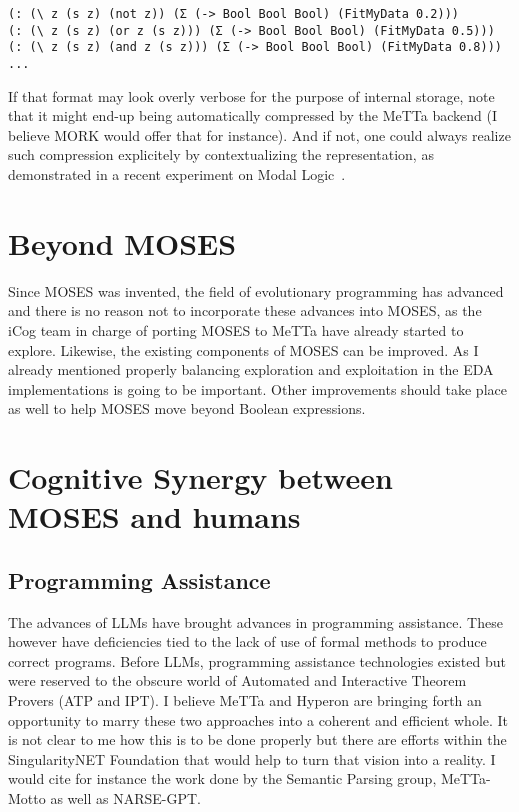 \documentclass[]{report}
\begin{document}
{\small
\begin{verbatim}
(: (\ z (s z) (not z)) (Σ (-> Bool Bool Bool) (FitMyData 0.2)))
(: (\ z (s z) (or z (s z))) (Σ (-> Bool Bool Bool) (FitMyData 0.5)))
(: (\ z (s z) (and z (s z))) (Σ (-> Bool Bool Bool) (FitMyData 0.8)))
...
\end{verbatim}
} If that format may look overly verbose for the purpose of internal
storage, note that it might end-up being automatically compressed by
the MeTTa backend (I believe MORK would offer that for instance).  And
if not, one could always realize such compression explicitely by
contextualizing the representation, as demonstrated in a recent
experiment on Modal Logic~\cite{ModalLogic}.

\section{Beyond MOSES}

Since MOSES was invented, the field of evolutionary programming has
advanced and there is no reason not to incorporate these advances into
MOSES, as the iCog team in charge of porting MOSES to MeTTa have
already started to explore.  Likewise, the existing components of
MOSES can be improved.  As I already mentioned properly balancing
exploration and exploitation in the EDA implementations is going to be
important.  Other improvements should take place as well to help MOSES
move beyond Boolean expressions.

\section{Cognitive Synergy between MOSES and humans}

\subsection{Programming Assistance}

The advances of LLMs have brought advances in programming assistance.
These however have deficiencies tied to the lack of use of formal
methods to produce correct programs.  Before LLMs, programming
assistance technologies existed but were reserved to the obscure world
of Automated and Interactive Theorem Provers (ATP and IPT).  I believe
MeTTa and Hyperon are bringing forth an opportunity to marry these two
approaches into a coherent and efficient whole.  It is not clear to me
how this is to be done properly but there are efforts within the
SingularityNET Foundation that would help to turn that vision into a
reality.  I would cite for instance the work done by the Semantic
Parsing group, MeTTa-Motto as well as NARSE-GPT.
\end{document}

